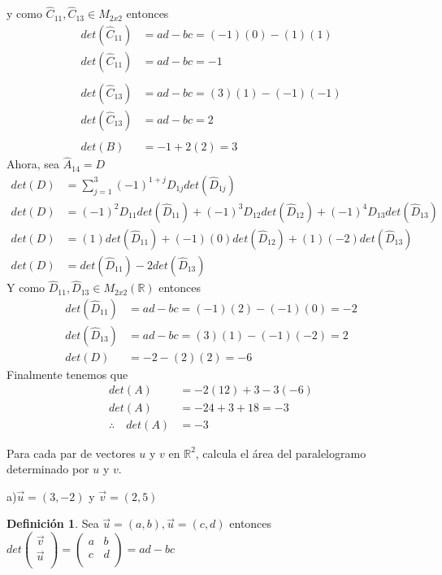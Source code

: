 \documentclass[letterpaper]{article}
\newcommand{\R}{\mathds{R}}
\renewcommand{\*}{\cdot}
\theoremstyle{definition}
\newtheorem{definition}{Definición}
\begin{document}
	y como $ \hat{C}_{11}, \hat{C}_{13} \in M_{2x2} $ entonces
	\begin{align*}
		det(\hat{C}_{11}) &= ad -bc = (-1)(0)- (1)(1)\\
		det(\hat{C}_{11}) &= ad -bc = -1\\
		\\
		det(\hat{C}_{13}) &= ad -bc = (3)(1) - (-1)(-1)\\
		det(\hat{C}_{13}) &= ad -bc = 2\\
		\\
		det(B) &= -1+ 2(2) = 3
	\end{align*}
	Ahora, sea $ \hat{A}_{14} = D $
	\begin{align*}
		det(D) &= \sum_{j = 1}^{3}(-1)^{1+j} D_{1j} det(\hat{D}_{1j})\\
		det(D) &= (-1)^2 D_{11} det(\hat{D}_{11}) + (-1)^3 D_{12} det(\hat{D}_{12}) + (-1)^4 D_{13} det(\hat{D}_{13})  \\
		det(D) &= (1)det(\hat{D}_{11}) + (-1)(0)det(\hat{D}_{12}) + (1)(-2) det(\hat{D}_{13})  \\
		det(D) &= det(\hat{D}_{11}) -2 det(\hat{D}_{13})  
	\end{align*}
	Y como $ \hat{D}_{11}, \hat{D}_{13} \in M_{2x2}(\R) $ entonces
	\begin{align*}
		det(\hat{D}_{11}) &= ad -bc = (-1)(2)-(-1)(0) = -2\\
		det(\hat{D}_{13}) &= ad -bc = (3)(1)-(-1)(-2) = 2\\
		det(D) &= -2-(2)(2) = -6
	\end{align*}
	Finalmente tenemos que
	\begin{align*}
		det(A) &= -2(12) + 3 -3(-6)\\
		det(A) &= -24 + 3 + 18 = -3\\
		\therefore \quad det(A) &= -3
	\end{align*}
	\begin{ejercicio}{15}
		Para cada par de vectores $u$ y $v$ en $\mathbb{R}^2$, calcula el área del paralelogramo determinado por $u$ y $v$.
	\end{ejercicio}
	\noindent a)$\vec{u} = (3,-2)$ y $\vec{v} = (2,5)$\\
	\begin{definition}
		Sea $ \vec{u} = (a,b), \vec{u} =(c,d) $ entonces $ det\begin{pmatrix}
		\vec{v}\\
		\vec{u}\\
		\end{pmatrix}  = \begin{pmatrix}
		a & b\\
		c & d\\
		\end{pmatrix} = ad-bc$ 	
	\end{definition}
\end{document}
